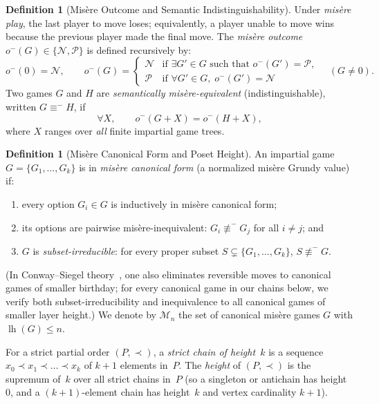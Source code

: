\documentclass[11pt]{amsart}
\theoremstyle{definition}
\newtheorem{definition}[theorem]{Definition}
\theoremstyle{remark}
\newcommand{\Npos}{\mathcal{N}}
\newcommand{\Ppos}{\mathcal{P}}
\newcommand{\Mlayer}{\mathcal{M}}
\DeclareMathOperator{\lh}{lh}
\begin{document}
\begin{definition}[Mis\`ere Outcome and Semantic Indistinguishability]
Under \emph{mis\`ere play}, the last player to move loses; equivalently, a player unable to move wins because the previous player made the final move. The \emph{mis\`ere outcome} $o^-(G) \in \{\Npos, \Ppos\}$ is defined recursively by:
\[
  o^-(0) = \Npos, \qquad
  o^-(G) = \begin{cases}
    \Npos & \text{if } \exists G' \in G \text{ such that } o^-(G') = \Ppos,\\
    \Ppos & \text{if } \forall G' \in G,\; o^-(G') = \Npos
  \end{cases} \quad (G \neq 0).
\]
Two games $G$ and $H$ are \emph{semantically mis\`ere-equivalent} (indistinguishable), written $G \equiv^- H$, if
\[
  \forall X,\qquad o^-(G + X) = o^-(H + X),
\]
where $X$ ranges over \emph{all} finite impartial game trees.
\end{definition}

\begin{definition}[Mis\`ere Canonical Form and Poset Height]
\label{def:canonical}
An impartial game $G = \{G_1, \dots, G_k\}$ is in \emph{mis\`ere canonical form} (a normalized mis\`ere Grundy value) if:
\begin{enumerate}
  \item every option $G_i \in G$ is inductively in mis\`ere canonical form;
  \item its options are pairwise mis\`ere-inequivalent: $G_i \not\equiv^- G_j$ for all $i \neq j$; and
  \item $G$ is \emph{subset-irreducible}: for every proper subset $S \subsetneq \{G_1, \dots, G_k\}$, $S \not\equiv^- G$.
\end{enumerate}
(In Conway--Siegel theory~\cite[Ch.~V, Theorem~2.5]{SiegelCGT}, one also eliminates reversible moves to canonical games of smaller birthday; for every canonical game in our chains below, we verify both subset-irreducibility and inequivalence to all canonical games of smaller layer height.) We denote by $\Mlayer_n$ the set of canonical mis\`ere games $G$ with $\lh(G) \le n$.

For a strict partial order $(P, \prec)$, a \emph{strict chain of height~$k$} is a sequence $x_0 \prec x_1 \prec \dots \prec x_k$ of $k+1$ elements in~$P$. The \emph{height} of $(P, \prec)$ is the supremum of~$k$ over all strict chains in~$P$ (so a singleton or antichain has height~$0$, and a $(k+1)$-element chain has height~$k$ and vertex cardinality $k+1$).
\end{definition}
\end{document}
